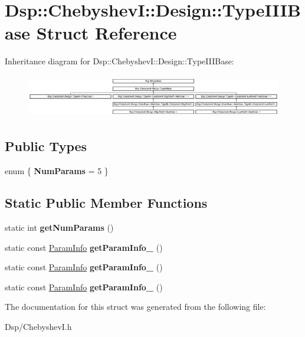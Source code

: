 \hypertarget{structDsp_1_1ChebyshevI_1_1Design_1_1TypeIIIBase}{\section{Dsp\-:\-:Chebyshev\-I\-:\-:Design\-:\-:Type\-I\-I\-I\-Base Struct Reference}
\label{structDsp_1_1ChebyshevI_1_1Design_1_1TypeIIIBase}
}
Inheritance diagram for Dsp\-:\-:Chebyshev\-I\-:\-:Design\-:\-:Type\-I\-I\-I\-Base\-:\begin{figure}[H]
\begin{center}
\leavevmode
\includegraphics[height=1.893171cm]{structDsp_1_1ChebyshevI_1_1Design_1_1TypeIIIBase}
\end{center}
\end{figure}
\subsection*{Public Types}
\begin{DoxyCompactItemize}
\item 
enum \{ {\bfseries Num\-Params} =  5
 \}
\end{DoxyCompactItemize}
\subsection*{Static Public Member Functions}
\begin{DoxyCompactItemize}
\item 
\hypertarget{structDsp_1_1ChebyshevI_1_1Design_1_1TypeIIIBase_a245144cb319d9db0752924fa01dc4fc9}{static int {\bfseries get\-Num\-Params} ()}\label{structDsp_1_1ChebyshevI_1_1Design_1_1TypeIIIBase_a245144cb319d9db0752924fa01dc4fc9}

\item 
\hypertarget{structDsp_1_1ChebyshevI_1_1Design_1_1TypeIIIBase_a8c8ad980ac9e939969f8b072a54879ef}{static const \hyperlink{classDsp_1_1ParamInfo}{Param\-Info} {\bfseries get\-Param\-Info\-\_} ()}\label{structDsp_1_1ChebyshevI_1_1Design_1_1TypeIIIBase_a8c8ad980ac9e939969f8b072a54879ef}

\item 
\hypertarget{structDsp_1_1ChebyshevI_1_1Design_1_1TypeIIIBase_a36ae359a610c0b4c159c94d95945d10b}{static const \hyperlink{classDsp_1_1ParamInfo}{Param\-Info} {\bfseries get\-Param\-Info\-\_} ()}\label{structDsp_1_1ChebyshevI_1_1Design_1_1TypeIIIBase_a36ae359a610c0b4c159c94d95945d10b}

\item 
\hypertarget{structDsp_1_1ChebyshevI_1_1Design_1_1TypeIIIBase_a4bf680cccd36aa518636569276477bc5}{static const \hyperlink{classDsp_1_1ParamInfo}{Param\-Info} {\bfseries get\-Param\-Info\-\_} ()}\label{structDsp_1_1ChebyshevI_1_1Design_1_1TypeIIIBase_a4bf680cccd36aa518636569276477bc5}

\end{DoxyCompactItemize}


The documentation for this struct was generated from the following file\-:\begin{DoxyCompactItemize}
\item 
Dsp/Chebyshev\-I.\-h\end{DoxyCompactItemize}

